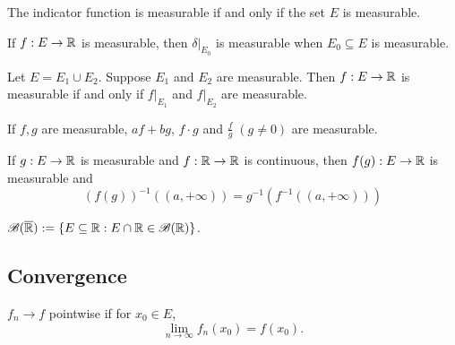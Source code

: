 \documentclass[class=book, crop=false]{standalone}
\begin{document}
        \begin{theorem}
            The indicator function is measurable if and only if the set $E$ is measurable.
        \end{theorem}

        \begin{theorem}
            If $f : E \rightarrow \mathbb{R}$ is measurable, then $\delta|_{E_0}$ is measurable when $E_0 \subseteq E$ is measurable.
        \end{theorem}

        \begin{theorem}
            Let $E = E_1 \cup E_2$. Suppose $E_1$ and $E_2$ are measurable. Then $f : E \rightarrow \mathbb{R}$ is measurable if and only if $f|_{E_1}$ and $f|_{E_2}$ are measurable.
        \end{theorem}

        \begin{theorem}
            If $f, g$ are measurable, $af + bg$, $f \cdot g$ and $\frac{f}{g} \; (g \neq 0)$ are measurable.
        \end{theorem}

        \begin{theorem}
            If $g : E \rightarrow \mathbb{R}$ is measurable and $f : \mathbb{R} \rightarrow \mathbb{R}$ is continuous, then $f(g) : E \rightarrow \mathbb{R}$ is measurable and
            \begin{equation*}
                (f(g))^{-1}((a, +\infty)) = g^{-1}(f^{-1}((a, +\infty)))
            \end{equation*}
        \end{theorem}

        \begin{definition}
            $\mathscr{B}(\overline{\mathbb{R}}) := \{E \subseteq \mathbb{R} : E \cap \mathbb{R} \in \mathscr{B}(\mathbb{R})\}$.
        \end{definition}

        \subsection{Convergence}
        \begin{definition}
            $f_n \rightarrow f$ pointwise if for $x_0 \in E$,
            \begin{equation*}
                \lim_{n \rightarrow \infty} f_n(x_0) = f(x_0).
            \end{equation*}
        \end{definition}
\end{document}
